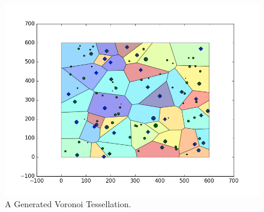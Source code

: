 \begin{figure}[H]
\includegraphics[width=\textwidth]{Images/recentre1.png}
\caption{A Generated Voronoi Tessellation.}
\label{fig:gen_voronoi}
\end{figure}
